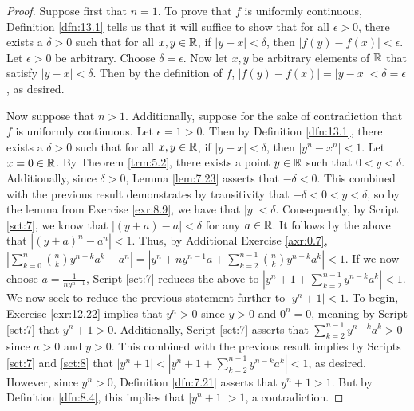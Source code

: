 \documentclass[../main.tex]{subfiles}
\begin{document}
\begin{exercise}
\begin{proof}

        Suppose first that $n=1$. To prove that $f$ is uniformly continuous, Definition \ref{dfn:13.1} tells us that it will suffice to show that for all $\epsilon>0$, there exists a $\delta>0$ such that for all $x,y\in\mathbb{R}$, if $|y-x|<\delta$, then $|f(y)-f(x)|<\epsilon$. Let $\epsilon>0$ be arbitrary. Choose $\delta=\epsilon$. Now let $x,y$ be arbitrary elements of $\mathbb{R}$ that satisfy $|y-x|<\delta$. Then by the definition of $f$, $|f(y)-f(x)|=|y-x|<\delta=\epsilon$, as desired.\par
        Now suppose that $n>1$. Additionally, suppose for the sake of contradiction that $f$ is uniformly continuous. Let $\epsilon=1>0$. Then by Definition \ref{dfn:13.1}, there exists a $\delta>0$ such that for all $x,y\in\mathbb{R}$, if $|y-x|<\delta$, then $|y^n-x^n|<1$. Let $x=0\in\mathbb{R}$. By Theorem \ref{trm:5.2}, there exists a point $y\in\mathbb{R}$ such that $0<y<\delta$. Additionally, since $\delta>0$, Lemma \ref{lem:7.23} asserts that $-\delta<0$. This combined with the previous result demonstrates by transitivity that $-\delta<0<y<\delta$, so by the lemma from Exercise \ref{exr:8.9}, we have that $|y|<\delta$. Consequently, by Script \ref{sct:7}, we know that $|(y+a)-a|<\delta$ for any $a\in\mathbb{R}$. It follows by the above that $|(y+a)^n-a^n|<1$. Thus, by Additional Exercise \ref{axr:0.7}, $|\sum_{k=0}^n\binom{n}{k}y^{n-k}a^k-a^n|=|y^n+ny^{n-1}a+\sum_{k=2}^{n-1}\binom{n}{k}y^{n-k}a^k|<1$. If we now choose $a=\frac{1}{ny^{n-1}}$, Script \ref{sct:7} reduces the above to $|y^n+1+\sum_{k=2}^{n-1}y^{n-k}a^k|<1$. We now seek to reduce the previous statement further to $|y^n+1|<1$. To begin, Exercise \ref{exr:12.22} implies that $y^n>0$ since $y>0$ and $0^n=0$, meaning by Script \ref{sct:7} that $y^n+1>0$. Additionally, Script \ref{sct:7} asserts that $\sum_{k=2}^{n-1}y^{n-k}a^k>0$ since $a>0$ and $y>0$. This combined with the previous result implies by Scripts \ref{sct:7} and \ref{sct:8} that $|y^n+1|<|y^n+1+\sum_{k=2}^{n-1}y^{n-k}a^k|<1$, as desired. However, since $y^n>0$, Definition \ref{dfn:7.21} asserts that $y^n+1>1$. But by Definition \ref{dfn:8.4}, this implies that $|y^n+1|>1$, a contradiction.

\end{proof}
\end{exercise}
\end{document}
